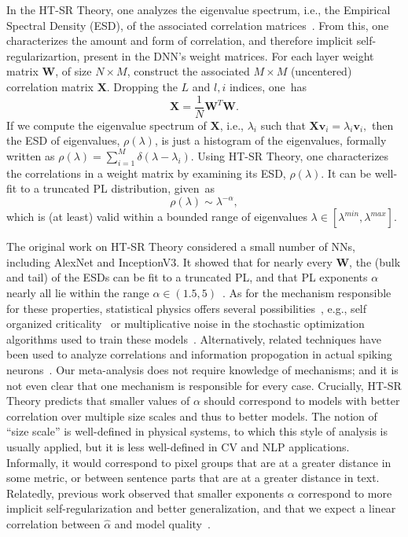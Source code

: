 In the HT-SR Theory, one analyzes the eigenvalue spectrum, i.e., the Empirical Spectral Density (ESD), of the associated correlation matrices~\cite{MM18_TR,MM19_HTSR_ICML,MM20_SDM}.
From this, one characterizes the amount and form of correlation, and therefore implicit self-regularizartion, present in the DNN's weight matrices.
For each layer weight matrix $\mathbf{W}$, of size $N \times M$, construct the associated $M\times M$ (uncentered) correlation matrix $\mathbf{X}$. 
Dropping the $L$ and $l,i$ indices, one~has
$$
\mathbf{X} = \frac{1}{N}\mathbf{W}^{T}\mathbf{W}.
$$
If we compute the eigenvalue spectrum of $\mathbf{X}$, i.e., $\lambda_i$ such that
$  %
\mathbf{X}\mathbf{v}_{i}=\lambda_{i}\mathbf{v}_{i} , 
$  %
then the ESD of eigenvalues, $\rho(\lambda)$, is just a histogram of the eigenvalues, formally written as
$\rho(\lambda)=\sum\nolimits_{i=1}^{M}\delta(\lambda-\lambda_{i})  .$
Using HT-SR Theory, one characterizes the correlations in a weight matrix by examining its ESD, $\rho(\lambda)$.
It can be well-fit to a truncated PL distribution, given~as
\begin{equation}
\rho(\lambda)\sim\lambda^{-\alpha}  ,
\label{eqn:eigenval_pl}
\end{equation}
which is (at least) valid within a bounded range of eigenvalues $\lambda\in[\lambda^{min},\lambda^{max}]$.  

The original work on HT-SR Theory considered a small number of NNs, including AlexNet and InceptionV3. 
It showed that for nearly every $\mathbf{W}$, the (bulk and tail) of the ESDs can be fit to a truncated PL, and that PL exponents $\alpha$ nearly all lie within the range $\alpha\in(1.5,5)$~\cite{MM18_TR,MM19_HTSR_ICML,MM20_SDM}.
%
As for the mechanism responsible for these properties, statistical physics offers several possibilities~\cite{SornetteBook,nishimori01}, e.g., self organized criticality~\cite{SOC87,SOCat25yrs} or multiplicative noise in the stochastic optimization algorithms used to train these models~\cite{HodMah20A_TR,SorCon97}.
Alternatively, related techniques have been used to analyze correlations and information propogation in actual spiking neurons~\cite{SYYRP11,YKYP14}.
Our meta-analysis does not require knowledge of mechanisms; and it is not even clear that one mechanism is responsible for every case.
%
Crucially, HT-SR Theory predicts that smaller values of $\alpha$ should correspond to models with better correlation over multiple size scales and thus to better models.
The notion of ``size scale'' is well-defined in physical systems, to which this style of analysis is usually applied, but it is less well-defined in CV and NLP applications.
Informally, it would correspond to pixel groups that are at a greater distance in some metric, or between sentence parts that are at a greater distance in text.
Relatedly, previous work observed that smaller exponents $\alpha$ correspond to more implicit self-regularization and better generalization, and that we expect a linear correlation between $\hat{\alpha}$ and model quality~\cite{MM18_TR,MM19_HTSR_ICML,MM20_SDM}.


